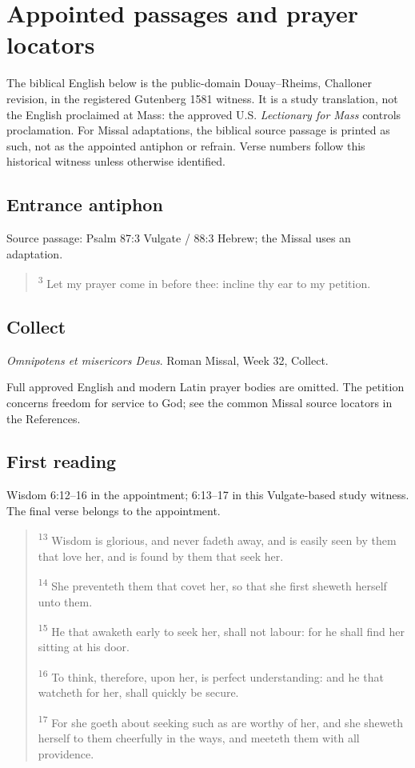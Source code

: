 \section{Appointed passages and prayer locators}
The biblical English below is the public-domain Douay--Rheims, Challoner revision, in the registered Gutenberg 1581 witness. It is a study translation, not the English proclaimed at Mass: the approved U.S. \textit{Lectionary for Mass} controls proclamation. For Missal adaptations, the biblical source passage is printed as such, not as the appointed antiphon or refrain. Verse numbers follow this historical witness unless otherwise identified.

\subsection{Entrance antiphon}
\label{proper-entrance}
Source passage: Psalm 87:3 Vulgate / 88:3 Hebrew; the Missal uses an adaptation.

\begin{quote}
\textsuperscript{3} Let my prayer come in before thee: incline thy ear to my petition.
\end{quote}


\subsection{Collect}
\label{proper-collect}
\textit{Omnipotens et misericors Deus}. Roman Missal, Week 32, Collect.

Full approved English and modern Latin prayer bodies are omitted. The petition concerns freedom for service to God; see the common Missal source locators in the References.

\subsection{First reading}
\label{proper-first-reading}
Wisdom 6:12--16 in the appointment; 6:13--17 in this Vulgate-based study witness. The final verse belongs to the appointment.

\begin{quote}
\textsuperscript{13} Wisdom is glorious, and never fadeth away, and is easily seen by them that love her, and is found by them that seek her.

\textsuperscript{14} She preventeth them that covet her, so that she first sheweth herself unto them.

\textsuperscript{15} He that awaketh early to seek her, shall not labour: for he shall find her sitting at his door.

\textsuperscript{16} To think, therefore, upon her, is perfect understanding: and he that watcheth for her, shall quickly be secure.

\textsuperscript{17} For she goeth about seeking such as are worthy of her, and she sheweth herself to them cheerfully in the ways, and meeteth them with all providence.
\end{quote}



